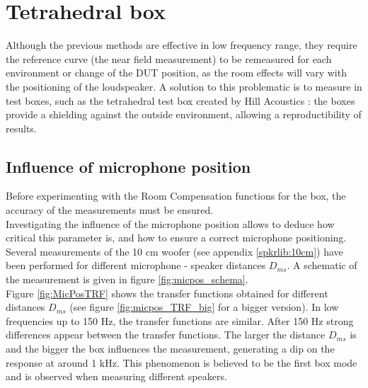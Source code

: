 \documentclass{report}
\begin{document}
\section{Tetrahedral box}
Although the previous methods are effective in low frequency range, they require the reference curve (the near field measurement) to be remeasured for each environment or change of the DUT position, as the room effects will vary with the positioning of the loudspeaker. A solution to this problematic is to measure in test boxes, such as the tetrahedral test box created by Hill Acoustics \citep[see][]{tetbox}: the boxes provide a shielding against the outside environment, allowing a reproductibility of results. 

\subsection{Influence of microphone position}
Before experimenting with the Room Compensation functions for the box, the accuracy of the measurements must be ensured.\\ 
Investigating the influence of the microphone position allows to deduce how critical this parameter is, and how to ensure a correct microphone positioning. Several measurements of the 10 cm woofer (see appendix \ref{spkrlib:10cm}) have been performed for different microphone - speaker distances $D_{ms}$. A schematic of the measurement is given in figure \ref{fig:micpos_schema}.  \\

Figure \ref{fig:MicPosTRF} shows the transfer functions obtained for different distances $D_{ms}$ (see figure \ref{fig:micpos_TRF_big} for a bigger version). In low frequencies up to 150 Hz, the transfer functions are similar. After 150 Hz strong differences appear between the transfer functions. The larger the distance $D_{ms}$ is and the bigger the box influences the measurement, generating a dip on the response at around 1 kHz. This phenomenon is believed to be the first box mode and is observed when measuring different speakers. \\
\end{document}

